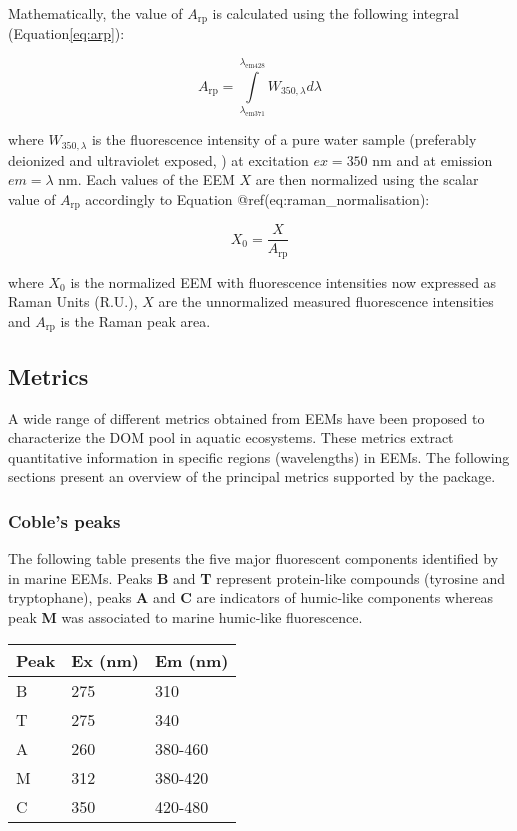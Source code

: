 \documentclass[]{book}
\begin{document}
Mathematically, the value of \(A_{\text{rp}}\) is calculated using the
following integral (Equation\ref{eq:arp}):

\begin{equation}
A_{\text{rp}} = \int\limits_{\lambda_{\text{em}371}}^{\lambda_{\text{em}428}} W_{350, \lambda} d\lambda
\label{eq:arp}
\end{equation}

where \(W_{350, \lambda}\) is the fluorescence intensity of a pure water
sample (preferably deionized and ultraviolet exposed,
\citet{Lawaetz2009}) at excitation \(ex = 350\) nm and at emission
\(em = \lambda\) nm. Each values of the EEM \(X\) are then normalized
using the scalar value of \(A_{\text{rp}}\) accordingly to Equation
@ref(eq:raman\_normalisation):

\begin{equation}
X_0 = \frac{X}{A_{\text{rp}}}
\label{eq:raman_normalisation}
\end{equation}

where \(X_0\) is the normalized EEM with fluorescence intensities now
expressed as Raman Units (R.U.), \(X\) are the unnormalized measured
fluorescence intensities and \(A_{\text{rp}}\) is the Raman peak area.

\subsection{Metrics}\label{metrics-1}

A wide range of different metrics obtained from EEMs have been proposed
to characterize the DOM pool in aquatic ecosystems. These metrics
extract quantitative information in specific regions (wavelengths) in
EEMs. The following sections present an overview of the principal
metrics supported by the package.

\subsubsection{Coble's peaks}\label{cobles-peaks}

The following table presents the five major fluorescent components
identified by \citep{Coble1996} in marine EEMs. Peaks \textbf{B} and
\textbf{T} represent protein-like compounds (tyrosine and tryptophane),
peaks \textbf{A} and \textbf{C} are indicators of humic-like components
whereas peak \textbf{M} was associated to marine humic-like
fluorescence.

\begin{longtable}[]{@{}lll@{}}
\toprule
Peak & Ex (nm) & Em (nm)\tabularnewline
\midrule
\endhead
B & 275 & 310\tabularnewline
T & 275 & 340\tabularnewline
A & 260 & 380-460\tabularnewline
M & 312 & 380-420\tabularnewline
C & 350 & 420-480\tabularnewline
\bottomrule
\end{longtable}
\end{document}
